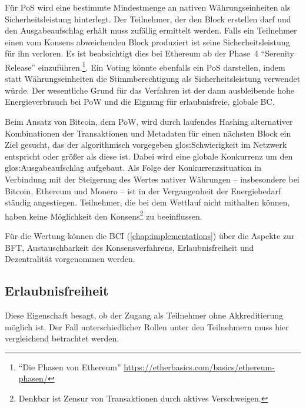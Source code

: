 Für \gls{PoS} wird \zB{} eine bestimmte Mindestmenge an nativen Währungseinheiten als Sicherheitsleistung hinterlegt.
Der Teilnehmer, der den Block erstellen darf und den Ausgabeaufschlag erhält muss zufällig ermittelt werden.
Falls ein Teilnehmer einen vom Konsens abweichenden Block produziert ist seine Sicherheitsleistung für ihn verloren.
Es ist beabsichtigt dies bei Ethereum ab der Phase~4 \enquote{Serenity Release} einzuführen.\footnote{\enquote{Die Phasen von Ethereum} \url{https://etherbasics.com/basics/ethereum-phasen/}}.
Ein Voting könnte ebenfalls ein \gls{PoS} darstellen, indem statt Währungseinheiten \zB{} die Stimmberechtigung als Sicherheitsleistung verwendet würde.
Der wesentliche Grund für das Verfahren ist der dann ausbleibende hohe Energieverbrauch bei \gls{PoW} und die Eignung für erlaubnisfreie, globale \gls{BC}.

Beim Ansatz von Bitcoin, dem \gls{PoW}, wird durch laufendes Hashing alternativer Kombinationen der Transaktionen und Metadaten für einen nächsten Block ein Ziel gesucht, das der algorithmisch vorgegeben \gls{glos:Schwierigkeit} im Netzwerk entspricht oder größer als diese ist.
Dabei wird eine globale Konkurrenz um den \gls{glos:Ausgabeaufschlag} aufgebaut.
Als Folge der Konkurrenzsituation in Verbindung mit der Steigerung des Wertes nativer Währungen -- insbesondere bei Bitcoin, Ethereum und Monero -- ist in der Vergangenheit der Energiebedarf ständig angestiegen.
Teilnehmer, die bei dem Wettlauf nicht mithalten können, haben keine Möglichkeit den Konsens\footnote{Denkbar ist Zensur von Transaktionen durch aktives Verschweigen.} zu beeinflussen.

Für die Wertung können die \gls{BCI} (\ref{chap:implementations}) \zB{} über die Aspekte zur \gls{BFT}, Austauschbarkeit des Konsensverfahrens, Erlaubnisfreiheit und Dezentralität vorgenommen werden.

\subsection{Erlaubnisfreiheit}\label{krit:erlaubnisfreiheit}

Diese Eigenschaft besagt, ob der Zugang als Teilnehmer ohne Akkreditierung möglich ist.
Der Fall unterschiedlicher Rollen unter den Teilnehmern muss hier vergleichend betrachtet werden.


